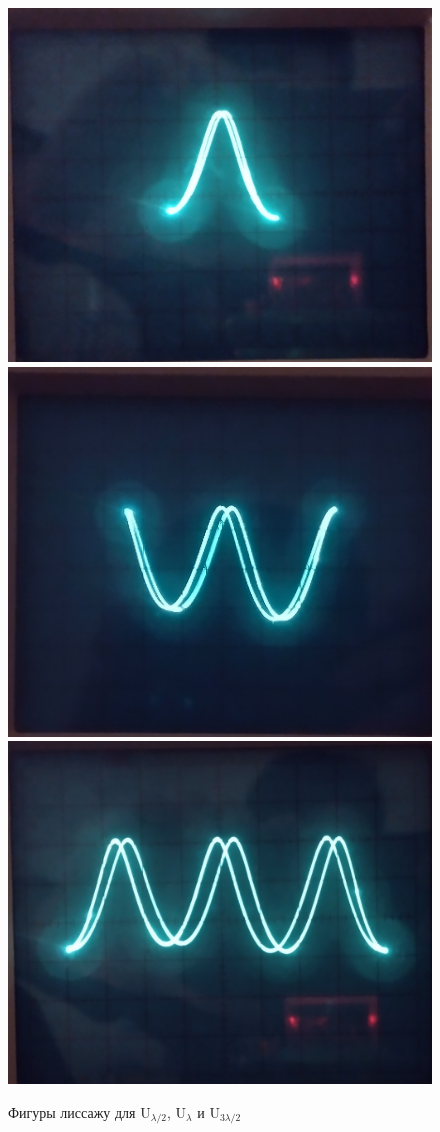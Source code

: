\documentclass{article}
\begin{document}
\newpage
\begin{figure}[h]
    \begin{center}
        \includegraphics[width = 0.3\linewidth]{1.jpg}
        \includegraphics[width = 0.3\linewidth]{2.jpg}
        \includegraphics[width = 0.3\linewidth]{3.jpg}
    \end{center}
    \caption{Фигуры лиссажу для U$_{\lambda/2}$, U$_{\lambda}$ и U$_{3\lambda/2}$}
\end{figure}
\end{document}

